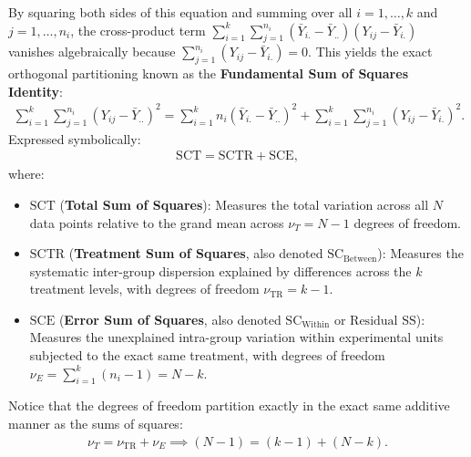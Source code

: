 By squaring both sides of this equation and summing over all $i = 1, \dots, k$ and $j = 1, \dots, n_i$, the cross-product term $\sum_{i=1}^k \sum_{j=1}^{n_i} (\bar{Y}_{i.} - \bar{Y}_{..})(Y_{ij} - \bar{Y}_{i.})$ vanishes algebraically because $\sum_{j=1}^{n_i} (Y_{ij} - \bar{Y}_{i.}) = 0$. This yields the exact orthogonal partitioning known as the \textbf{Fundamental Sum of Squares Identity}:
\begin{align}
	\sum_{i=1}^k \sum_{j=1}^{n_i} (Y_{ij} - \bar{Y}_{..})^2 = \sum_{i=1}^k n_i (\bar{Y}_{i.} - \bar{Y}_{..})^2 + \sum_{i=1}^k \sum_{j=1}^{n_i} (Y_{ij} - \bar{Y}_{i.})^2.
\label{eq:particion_suma_cuadrados}
\end{align}
Expressed symbolically:
\begin{align}
	\text{SCT} = \text{SCTR} + \text{SCE},
\end{align}
where:
\begin{itemize}
	\item $\text{SCT}$ (\textbf{Total Sum of Squares}): Measures the total variation across all $N$ data points relative to the grand mean across $\nu_T = N - 1$ degrees of freedom.
	\item $\text{SCTR}$ (\textbf{Treatment Sum of Squares}, also denoted $\text{SC}_{\text{Between}}$): Measures the systematic inter-group dispersion explained by differences across the $k$ treatment levels, with degrees of freedom $\nu_{\text{TR}} = k - 1$.
	\item $\text{SCE}$ (\textbf{Error Sum of Squares}, also denoted $\text{SC}_{\text{Within}}$ or $\text{Residual SS}$): Measures the unexplained intra-group variation within experimental units subjected to the exact same treatment, with degrees of freedom $\nu_E = \sum_{i=1}^k (n_i - 1) = N - k$.
\end{itemize}

Notice that the degrees of freedom partition exactly in the exact same additive manner as the sums of squares:
\begin{align}
	\nu_T = \nu_{\text{TR}} + \nu_E \implies (N - 1) = (k - 1) + (N - k).
\end{align}
